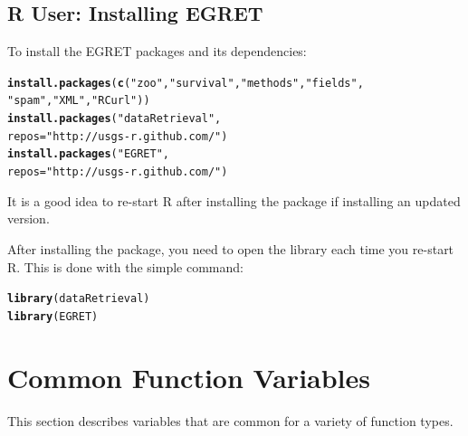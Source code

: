 \documentclass[a4paper,11pt]{article}\usepackage[]{graphicx}\usepackage[]{color}
\makeatletter
\newcommand{\hlstr}[1]{\textcolor[rgb]{0.192,0.494,0.8}{#1}}%
\newcommand{\hlstd}[1]{\textcolor[rgb]{0.345,0.345,0.345}{#1}}%
\newcommand{\hlkwc}[1]{\textcolor[rgb]{0.333,0.667,0.333}{#1}}%
\newcommand{\hlkwd}[1]{\textcolor[rgb]{0.737,0.353,0.396}{\textbf{#1}}}%
\newenvironment{kframe}{%
 \def\at@end@of@kframe{}%
 \ifinner\ifhmode%
  \def\at@end@of@kframe{\end{minipage}}%
  \begin{minipage}{\columnwidth}%
 \fi\fi%
 \def\FrameCommand##1{\hskip\@totalleftmargin \hskip-\fboxsep
 \colorbox{shadecolor}{##1}\hskip-\fboxsep
     \hskip-\linewidth \hskip-\@totalleftmargin \hskip\columnwidth}%
 \MakeFramed {\advance\hsize-\width
   \@totalleftmargin\z@ \linewidth\hsize
   \@setminipage}}%
 {\par\unskip\endMakeFramed%
 \at@end@of@kframe}
\newenvironment{knitrout}{}{} %
\makeatother
\begin{document}
\subsection{R User: Installing EGRET}
To install the EGRET packages and its dependencies:

\begin{knitrout}
\color{fgcolor}\begin{kframe}
\begin{alltt}
\hlkwd{install.packages}\hlstd{(}\hlkwd{c}\hlstd{(}\hlstr{"zoo"}\hlstd{,}\hlstr{"survival"}\hlstd{,}\hlstr{"methods"}\hlstd{,}\hlstr{"fields"}\hlstd{,}
                   \hlstr{"spam"}\hlstd{,}\hlstr{"XML"}\hlstd{,}\hlstr{"RCurl"}\hlstd{))}
\hlkwd{install.packages}\hlstd{(}\hlstr{"dataRetrieval"}\hlstd{,}
                 \hlkwc{repos}\hlstd{=}\hlstr{"http://usgs-r.github.com/"}\hlstd{)}
\hlkwd{install.packages}\hlstd{(}\hlstr{"EGRET"}\hlstd{,}
                 \hlkwc{repos}\hlstd{=}\hlstr{"http://usgs-r.github.com/"}\hlstd{)}
\end{alltt}
\end{kframe}
\end{knitrout}


It is a good idea to re-start R after installing the package if installing an updated version. 

After installing the package, you need to open the library each time you re-start R.  This is done with the simple command:
\begin{knitrout}
\color{fgcolor}\begin{kframe}
\begin{alltt}
\hlkwd{library}\hlstd{(dataRetrieval)}
\hlkwd{library}\hlstd{(EGRET)}
\end{alltt}
\end{kframe}
\end{knitrout}


\newpage
\FloatBarrier
\section{Common Function Variables}
\label{sec:appendixPlot}
This section describes variables that are common for a variety of function types. 

\end{document}
